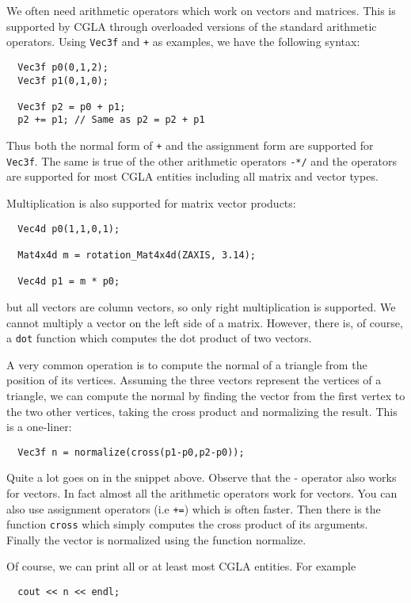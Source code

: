 \documentclass[a4paper]{article}
\begin{document}
We often need arithmetic operators which work on vectors and matrices. This is supported by CGLA through overloaded versions of the standard arithmetic operators. Using \texttt{Vec3f} and \texttt{+} as examples, we have the following syntax:
\begin{verbatim}
  Vec3f p0(0,1,2);
  Vec3f p1(0,1,0);
  
  Vec3f p2 = p0 + p1;
  p2 += p1; // Same as p2 = p2 + p1
\end{verbatim}
Thus both the normal form of \texttt{+} and the assignment form are supported for \texttt{Vec3f}. The same is true of the other arithmetic operators \texttt{-*/} and the operators are supported for most  CGLA entities including all matrix and vector types.

Multiplication is also supported for matrix vector products:
\begin{verbatim}
  Vec4d p0(1,1,0,1);
  
  Mat4x4d m = rotation_Mat4x4d(ZAXIS, 3.14);

  Vec4d p1 = m * p0;
\end{verbatim}

but all vectors are column vectors, so only right multiplication is supported. We cannot multiply a vector on the left side of a matrix. However, there is, of course, a \texttt{dot} function which computes the dot product of two vectors. 

A very common operation is to compute the normal of a triangle from
the position of its vertices. Assuming the three vectors represent the
vertices of a triangle, we can compute the normal by finding the
vector from the first vertex to the two other vertices, taking the
cross product and normalizing the result. This is a one-liner:

\begin{verbatim}
  Vec3f n = normalize(cross(p1-p0,p2-p0));
\end{verbatim}

Quite a lot goes on in the snippet above. Observe that the - operator
also works for vectors. In fact almost all the arithmetic operators
work for vectors. You can also use assignment operators (i.e
\texttt{+=}) which is often faster. Then there is the function
\texttt{cross} which simply computes the cross product of its
arguments. Finally the vector is normalized using the
function normalize.

Of course, we can print all or at least most CGLA entities. For
example 

\begin{verbatim}
  cout << n << endl;
\end{verbatim}
\end{document}
